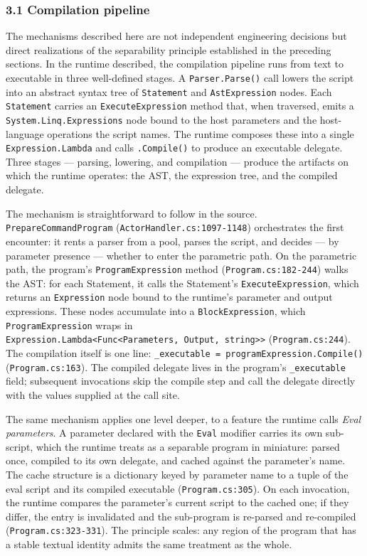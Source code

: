 \documentclass[
]{article}
\let\origtexttt\texttt%
\renewcommand{\texttt}[1]{\origtexttt{\seqsplit{#1}}}%
\let\texttt\origtexttt%
\begin{document}
\subsubsection{3.1 Compilation pipeline}\label{compilation-pipeline}

The mechanisms described here are not independent engineering decisions
but direct realizations of the separability principle established in the
preceding sections. In the runtime described, the compilation pipeline
runs from text to executable in three well-defined stages. A
\texttt{Parser.Parse()} call lowers the script into an abstract syntax
tree of \texttt{Statement} and \texttt{AstExpression} nodes. Each
\texttt{Statement} carries an \texttt{ExecuteExpression} method that,
when traversed, emits a \texttt{System.Linq.Expressions} node bound to
the host parameters and the host-language operations the script names.
The runtime composes these into a single \texttt{Expression.Lambda} and
calls \texttt{.Compile()} to produce an executable delegate. Three
stages --- parsing, lowering, and compilation --- produce the artifacts
on which the runtime operates: the AST, the expression tree, and the
compiled delegate.

The mechanism is straightforward to follow in the source.
\texttt{PrepareCommandProgram} (\texttt{ActorHandler.cs:1097-1148})
orchestrates the first encounter: it rents a parser from a pool, parses
the script, and decides --- by parameter presence --- whether to enter
the parametric path. On the parametric path, the program's
\texttt{ProgramExpression} method (\texttt{Program.cs:182-244}) walks
the AST: for each Statement, it calls the Statement's
\texttt{ExecuteExpression}, which returns an \texttt{Expression} node
bound to the runtime's parameter and output expressions. These nodes
accumulate into a \texttt{BlockExpression}, which
\texttt{ProgramExpression} wraps in
\texttt{Expression.Lambda\textless{}Func\textless{}Parameters,\ Output,\ string\textgreater{}\textgreater{}}
(\texttt{Program.cs:244}). The compilation itself is one line:
\texttt{\_executable\ =\ programExpression.Compile()}
(\texttt{Program.cs:163}). The compiled delegate lives in the program's
\texttt{\_executable} field; subsequent invocations skip the compile
step and call the delegate directly with the values supplied at the call
site.

The same mechanism applies one level deeper, to a feature the runtime
calls \emph{Eval parameters}. A parameter declared with the
\texttt{Eval} modifier carries its own sub-script, which the runtime
treats as a separable program in miniature: parsed once, compiled to its
own delegate, and cached against the parameter's name. The cache
structure is a dictionary keyed by parameter name to a tuple of the eval
script and its compiled executable (\texttt{Program.cs:305}). On each
invocation, the runtime compares the parameter's current script to the
cached one; if they differ, the entry is invalidated and the sub-program
is re-parsed and re-compiled (\texttt{Program.cs:323-331}). The
principle scales: any region of the program that has a stable textual
identity admits the same treatment as the whole.
\end{document}
